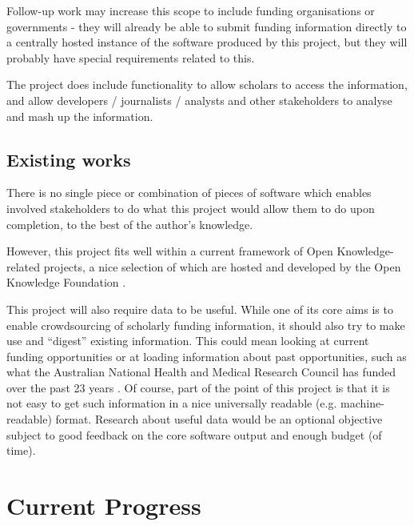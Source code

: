 \documentclass[11pt,fleqn,twoside]{article}
\begin{document}
Follow-up work may increase this scope to include funding organisations or governments - they will already be able to submit funding information directly to a centrally hosted instance of the software produced by this project, but they will probably have special requirements related to this.

The project does include functionality to allow scholars to access the information, and allow developers / journalists / analysts and other stakeholders to analyse and mash up the information.

\subsection{Existing works}
There is no single piece or combination of pieces of software which enables involved stakeholders to do what this project would allow them to do upon completion, to the best of the author's knowledge.

However, this project fits well within a current framework of Open Knowledge-related projects, a nice selection of which are hosted and developed by the Open Knowledge Foundation \cite{okfn-labs} \cite{okfn-github}.

This project will also require data to be useful. While one of its core aims is to enable crowdsourcing of scholarly funding information, it should also try to make use and ``digest'' existing information. This could mean looking at current funding opportunities \cite{rcuk-india} \cite{ahrc-opps} \cite{bbsrc-opps} \cite{epsrc-opps} or at loading information about past opportunities, such as what the Australian National Health and Medical Research Council has funded over the past 23 years \cite{au-nhmrc}. Of course, part of the point of this project is that it is not easy to get such information in a nice universally readable (e.g. machine-readable) format. Research about useful data would be an optional objective subject to good feedback on the core software output and enough budget (of time).

\section{Current Progress}


\end{document}
